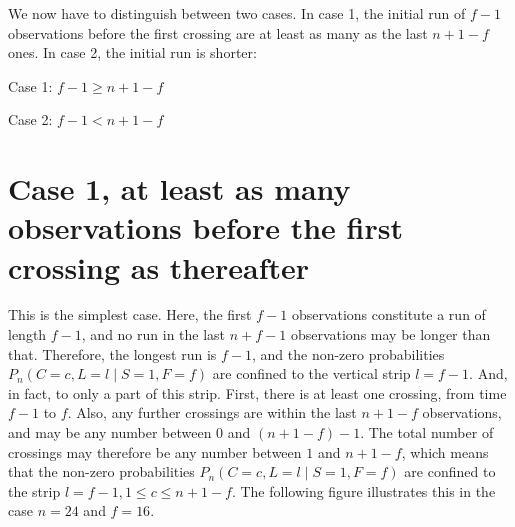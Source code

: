 We now have to distinguish between two cases. In case 1, the initial run of $f-1$ observations before the first crossing are at least as many as the last $n+1-f$ ones. In case 2, the initial run is shorter:

Case 1: $f-1 \geq n+1-f$

Case 2: $f-1<n+1-f$

\section{Case 1, at least as many observations before the first crossing as thereafter}

This is the simplest case. Here, the first $f-1$ observations constitute a run of length $f-1$, and no run in the last $n+f-1$ observations may be longer than that. Therefore, the longest run is $f-1$, and the non-zero probabilities $P_n (C=c,L=l \mid S=1,F=f)$ are confined to the vertical strip $l=f-1$. And, in fact, to only a part of this strip. First, there is at least one crossing, from time $f-1$ to $f$. Also, any further crossings are within the last $n+1-f$ observations, and may be any number between $0$ and $(n+1-f) - 1$. The total number of crossings may therefore be any number between $1$ and $n+1-f$, which means that the non-zero probabilities $P_n (C=c,L=l \mid S=1,F=f)$ are confined to the strip $l=f-1, 1 \leq c \leq n+1-f$. The following figure illustrates this in the case $n=24$ and $f=16$.

